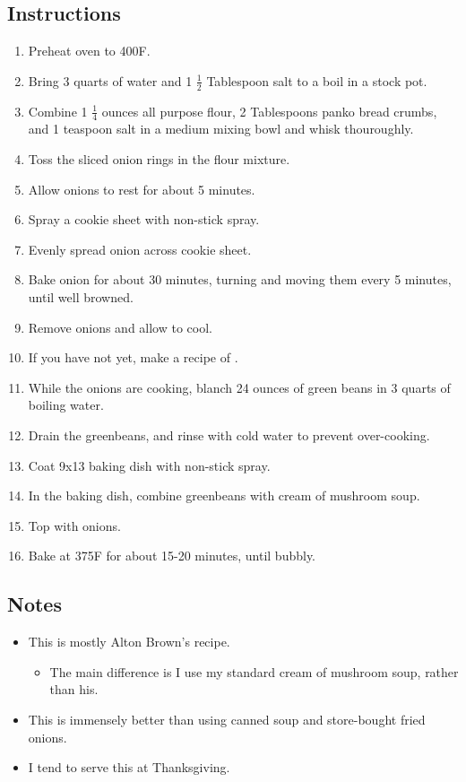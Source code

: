 \begin{multicols}{2}
\subsection*{Instructions}
\begin{enumerate}
    \item Preheat oven to 400F.
    \item Bring 3 quarts of water and 1 \( \frac{1}{2} \) Tablespoon salt to a boil in a stock pot.
    \item Combine 1 \( \frac{1}{4} \) ounces all purpose flour, 2 Tablespoons panko bread crumbs, and 1 teaspoon salt in a medium mixing bowl and whisk thouroughly.
    \item Toss the sliced onion rings in the flour mixture.
    \item Allow onions to rest for about 5 minutes.
    \item Spray a cookie sheet with non-stick spray.
    \item Evenly spread onion across cookie sheet.
    \item Bake onion for about 30 minutes, turning and moving them every 5 minutes, until well browned.
    \item Remove onions and allow to cool.
    \item If you have not yet, make a recipe of .
    \item While the onions are cooking, blanch 24 ounces of green beans in 3 quarts of boiling water.
    \item Drain the greenbeans, and rinse with cold water to prevent over-cooking.
    \item Coat 9x13 baking dish with non-stick spray.
    \item In the baking dish, combine greenbeans with cream of mushroom soup.
    \item Top with onions.
    \item Bake at 375F for about 15-20 minutes, until bubbly.
\end{enumerate}

\subsection*{Notes}
\begin{itemize}
    \item This is mostly Alton Brown's recipe.
    \begin{itemize}
        \item The main difference is I use my standard cream of mushroom soup, rather than his.
    \end{itemize}
    \item This is immensely better than using canned soup and store-bought fried onions.
    \item I tend to serve this at Thanksgiving.
\end{itemize}
\end{multicols}
\clearpage
